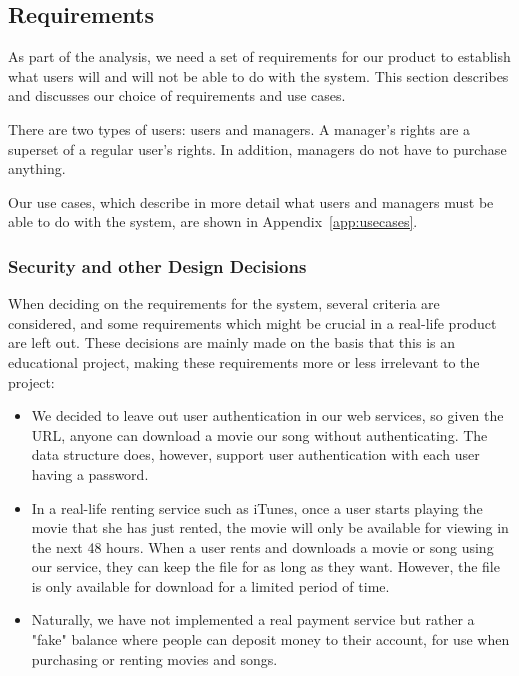 \subsection{Requirements}
As part of the analysis, we need a set of requirements for our product to establish what users will and will not be able to do with the system. This section describes and discusses our choice of requirements and use cases.


There are two types of users: users and managers. A manager’s rights are a superset of a regular user’s rights. In addition, managers do not have to purchase anything.


Our use cases, which describe in more detail what users and managers must be able to do with the system, are shown in Appendix~\ref{app:usecases}.

\subsubsection{Security and other Design Decisions}
When deciding on the requirements for the system, several criteria are considered, and some requirements which might be crucial in a real-life product are left out. These decisions are mainly made on the basis that this is an educational project, making these requirements more or less irrelevant to the project:
\begin{itemize}
\item We decided to leave out user authentication in our web services, so given the URL, anyone can download a movie our song without authenticating. The data structure does, however, support user authentication with each user having a password.
\item In a real-life renting service such as iTunes, once a user starts playing the movie that she has just rented, the movie will only be available for viewing in the next 48 hours. When a user rents and downloads a movie or song using our service, they can keep the file for as long as they want. However, the file is only available for download for a limited period of time.
\item Naturally, we have not implemented a real payment service but rather a "fake" balance where people can deposit money to their account, for use when purchasing or renting movies and songs.
\end{itemize}